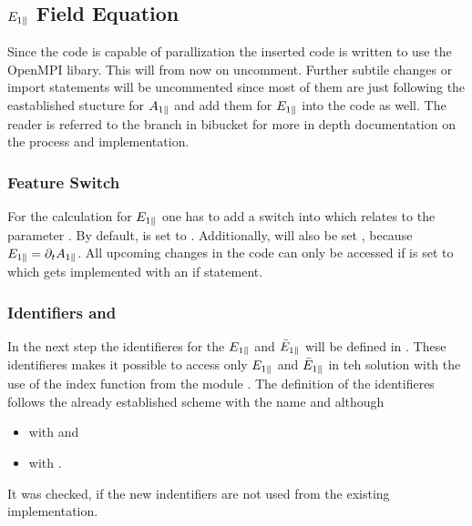 \subsection{$E_{1\parallel}$ Field Equation}
\label{sub:implementationFieldEpar}

Since the code is capable of parallization the inserted code is written to use the OpenMPI libary. This will from now on uncomment. Further subtile changes or import statements will be uncommented since most of them are just following the eastablished stucture for $A_{1\parallel}$ and add them for $E_{1\parallel}$ into the code as well. The reader is referred to the branch in bibucket\cite{FeatureEparBitbucket} for more in depth documentation on the process and implementation.

\subsubsection*{Feature Switch}

For the calculation for $E_{1\parallel}$ one has to add a switch into  which relates to the parameter . By default,  is set to . Additionally,  will also be set , because $E_{1\parallel} = \partial_t A_{1\parallel}$. All upcoming changes in the code can only be accessed if  is set to  which gets implemented with an if statement.

\subsubsection*{Identifiers  and }

In the next step the identifieres for the $E_{1\parallel}$ and $\bar{E}_{1\parallel}$ will be defined in . These identifieres makes it possible to access only $E_{1\parallel}$ and $\bar{E}_{1\parallel}$ in teh solution  with the use of the index function from the module . The definition of the identifieres follows the already established scheme with the name  and  although 
\begin{itemize}
    \item {} with  and
    \item {} with .
\end{itemize}
It was checked, if the new indentifiers are not used from the existing implementation. \bigskip

